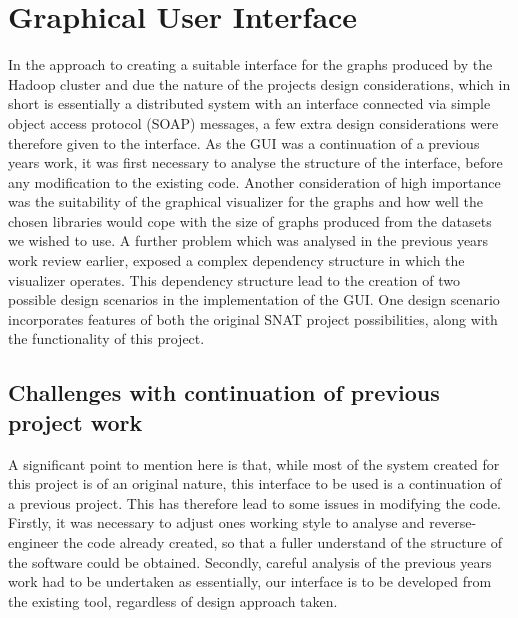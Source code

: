 \section{Graphical User Interface}
\label{sec:des_gui}

In the approach to creating a suitable interface for the graphs produced by the Hadoop cluster and due the nature of the projects design considerations, which in short is essentially a distributed system with an interface connected via simple object access protocol (SOAP) messages, a few extra design considerations were therefore given to the interface. As the GUI was a continuation of a previous years work, it was first necessary to analyse the structure of the interface, before any modification to the existing code. Another consideration of high importance was the suitability of the graphical visualizer for the graphs and how well the chosen libraries would cope with the size of graphs produced from the datasets we wished to use. A further problem which was analysed in the previous years work review earlier, exposed a complex dependency structure in which the visualizer operates. This dependency structure lead to the creation of two possible design scenarios in the implementation of the GUI. One design scenario incorporates features of both the original SNAT project possibilities, along with the functionality of this project. 

\subsection{Challenges with continuation of previous project work}
A significant point to mention here is that, while most of the system created for this project is of an original nature, this interface to be used is a continuation of a previous project. This has therefore lead to some issues in modifying the code. Firstly, it was necessary to adjust ones working style to analyse and reverse-engineer the code already created, so that a fuller understand of the structure of the software could be obtained. Secondly, careful analysis of the previous years work had to be undertaken as essentially, our interface is to be developed from the existing tool, regardless of design approach taken. 

